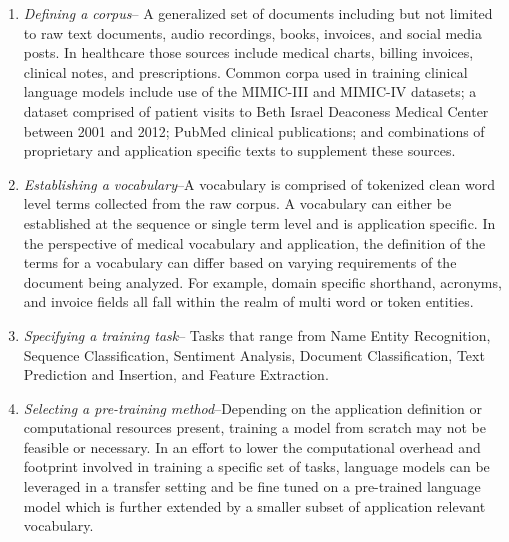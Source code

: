 \documentclass{article}
\begin{document}
\begin{enumerate}
    \item \textit{Defining a corpus}-- A generalized set of documents including but not limited to raw text documents, audio recordings, books, invoices, and social media posts. In healthcare those sources include medical charts, billing invoices, clinical notes, and prescriptions. Common corpa used in training clinical language models include use of the MIMIC-III and MIMIC-IV datasets; a dataset comprised of patient visits to Beth Israel Deaconess Medical Center between 2001 and 2012; PubMed clinical publications; and combinations of proprietary and application specific texts to supplement these sources.
    \item  \textit{Establishing a vocabulary}--A vocabulary is comprised of tokenized clean word level terms collected from the raw corpus. A vocabulary can either be established at the sequence or single term level and is application specific. In the perspective of medical vocabulary and application, the definition of the terms for a vocabulary can differ based on varying requirements of the document being analyzed. For example, domain specific shorthand, acronyms, and invoice fields all fall within the realm of multi word or token entities. 
    \item \textit{Specifying a training task}-- Tasks that range from Name Entity Recognition, Sequence Classification, Sentiment Analysis, Document Classification, Text Prediction and Insertion, and Feature Extraction.
    \item \textit{Selecting a pre-training method}--Depending on the application definition or computational resources present, training a model from scratch may not be feasible or necessary. In an effort to lower the computational overhead and footprint involved in training a specific set of tasks, language models can be leveraged in a transfer setting and be fine tuned on a pre-trained language model which is further extended by a smaller subset of application relevant vocabulary.
\end{enumerate}
\end{document}
